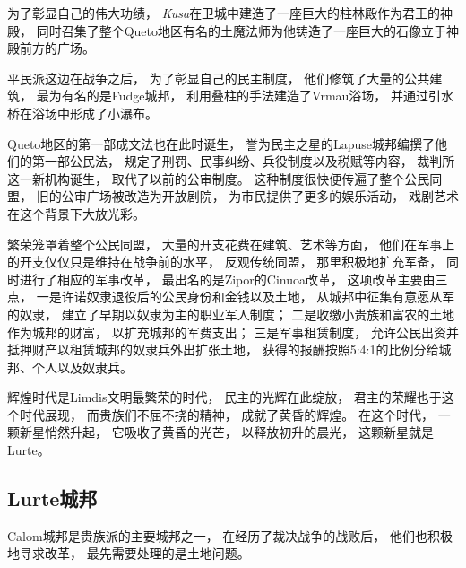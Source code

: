 \documentclass[UTF8,12pt,draft]{ctexbook}
\begin{document}
                为了彰显自己的伟大功绩，
                \emph{Kusa}在卫城中建造了一座巨大的柱林殿作为君王的神殿，
                同时召集了整个Queto地区有名的土魔法师为他铸造了一座巨大的石像立于神殿前方的广场。

                平民派这边在战争之后，
                为了彰显自己的民主制度，
                他们修筑了大量的公共建筑，
                最为有名的是Fudge城邦，
                利用叠柱的手法建造了Vrmau浴场，
                并通过引水桥在浴场中形成了小瀑布。

                Queto地区的第一部成文法也在此时诞生，
                誉为民主之星的Lapuse城邦编撰了他们的第一部公民法，
                规定了刑罚、民事纠纷、兵役制度以及税赋等内容，
                裁判所这一新机构诞生，
                取代了以前的公审制度。
                这种制度很快便传遍了整个公民同盟，
                旧的公审广场被改造为开放剧院，
                为市民提供了更多的娱乐活动，
                戏剧艺术在这个背景下大放光彩。

                繁荣笼罩着整个公民同盟，
                大量的开支花费在建筑、艺术等方面，
                他们在军事上的开支仅仅只是维持在战争前的水平，
                反观传统同盟，
                那里积极地扩充军备，
                同时进行了相应的军事改革，
                最出名的是Zipor的Cinuoa改革，
                这项改革主要由三点，
                一是许诺奴隶退役后的公民身份和金钱以及土地，
                从城邦中征集有意愿从军的奴隶，
                建立了早期以奴隶为主的职业军人制度；
                二是收缴小贵族和富农的土地作为城邦的财富，
                以扩充城邦的军费支出；
                三是军事租赁制度，
                允许公民出资并抵押财产以租赁城邦的奴隶兵外出扩张土地，
                获得的报酬按照5:4:1的比例分给城邦、个人以及奴隶兵。

                辉煌时代是Limdis文明最繁荣的时代，
                民主的光辉在此绽放，
                君主的荣耀也于这个时代展现，
                而贵族们不屈不挠的精神，
                成就了黄昏的辉煌。
                在这个时代，
                一颗新星悄然升起，
                它吸收了黄昏的光芒，
                以释放初升的晨光，
                这颗新星就是Lurte。
            \subsection{Lurte城邦}
                Calom城邦是贵族派的主要城邦之一，
                在经历了裁决战争的战败后，
                他们也积极地寻求改革，
                最先需要处理的是土地问题。
\end{document}
